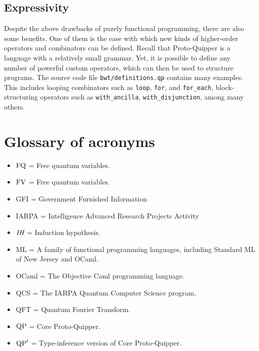 \documentclass[twoside]{article}
\begin{document}
\subsection{Expressivity}

Despite the above drawbacks of purely functional programming, there
are also some benefits. One of them is the ease with which new kinds
of higher-order operators and combinators can be defined. Recall that
Proto-Quipper is a language with a relatively small grammar. Yet, it
is possible to define any number of powerful custom operators, which
can then be used to structure programs. The source code file
\verb!bwt/definitions.qp! contains many examples. This includes looping
combinators such as \verb!loop!, \verb!for!, and \verb!for_each!,
block-structuring operators such as \verb!with_ancilla!,
\verb!with_disjunction!, among many others.

\clearpage
\section*{Glossary of acronyms}

\begin{itemize}
  \item $\mathop{\textrm{FQ}}\nolimits$ = Free quantum variables.
  \item $\mathop{\textrm{FV}}\nolimits$ = Free quantum variables.
  \item GFI = Government Furnished Information
  \item IARPA = Intelligence Advanced Research Projects Activity
  \item $\textit{IH}$ = Induction hypothesis.
  \item ML = A family of functional programming languages, including
    Standard ML of New Jersey and OCaml.
  \item OCaml = The Objective Caml programming language.
  \item QCS = The IARPA Quantum Computer Science program.
  \item QFT = Quantum Fourier Transform.
  \item ${\rm QP}$ = Core Proto-Quipper.
  \item ${\rm QP}'$ = Type-inference version of Core Proto-Quipper.
\end{itemize}

\clearpage

{}

\end{document}
